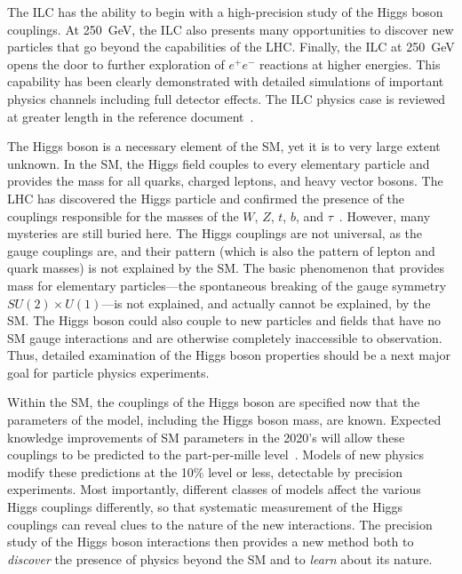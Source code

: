 \documentclass[%
 reprint,
 amsmath,amssymb,
 aps,
]{revtex4-1}
\def\ee{e^+e^-}
\begin{document}
The ILC has the ability to begin with a high-precision study of the Higgs boson couplings.  At 250~GeV, the ILC also
presents many opportunities to discover new particles that go beyond
the capabilities of the LHC.  Finally, the ILC at 250~GeV opens the
door to further exploration of $\ee$ reactions at higher energies. This capability has been clearly demonstrated with detailed simulations of important physics channels including full detector effects. The ILC physics case is reviewed at greater length in the reference document~\cite{ILCforESS}.

The Higgs boson is a necessary element of the SM, yet it is to very large extent unknown.    In the SM, the Higgs field
couples to every elementary particle and provides the mass for all
quarks, charged leptons, and heavy vector bosons.   The LHC has discovered
the Higgs particle and confirmed the presence of the couplings responsible for the
masses of the $W$, $Z$, $t$, $b$, and $\tau$~\cite{LHCHiggssummary}. 
 However, many mysteries are still
buried here.   The Higgs couplings are not universal, as the gauge
couplings are, and their pattern (which is also the pattern of lepton
and quark masses) is not explained by the SM.  The basic phenomenon that provides
mass for elementary particles---the spontaneous breaking of the gauge
symmetry $SU(2)\times U(1)$---is not explained, and actually cannot be
explained, by the SM.   The Higgs boson could also couple to new
particles and fields that have no SM gauge interactions and are
otherwise completely inaccessible to observation.  Thus, detailed
examination of the Higgs boson properties should be a next major
goal for particle physics experiments.

Within the SM, the couplings of the Higgs boson are specified now that
the parameters of the model, including the Higgs boson mass, are
known.  Expected knowledge improvements of SM parameters in the 2020's will allow these couplings to be predicted to the part-per-mille level~\cite{Lepage:2014fla}.
Models of new physics modify these predictions at the 10\% level or less, 
detectable by precision experiments.   Most importantly, different
classes of models affect the various Higgs couplings differently, so that
systematic measurement of the Higgs couplings can reveal clues to the
nature of the new interactions.   The precision study of the
Higgs boson interactions then provides a new method both to {\it discover}  the
presence of physics beyond the SM and to {\it learn}  about its nature.
\end{document}
